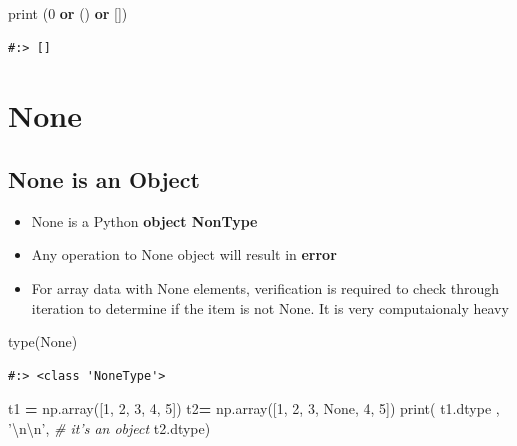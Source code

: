 \documentclass[
]{book}
\newenvironment{Shaded}{\begin{snugshade}}{\end{snugshade}}
\newcommand{\BuiltInTok}[1]{#1}
\newcommand{\CharTok}[1]{\textcolor[rgb]{0.5,0.5,0.5}{#1}}
\newcommand{\CommentTok}[1]{\textcolor[rgb]{0.37,0.37,0.37}{\textit{#1}}}
\newcommand{\DecValTok}[1]{\textcolor[rgb]{0.06,0.06,0.06}{#1}}
\newcommand{\KeywordTok}[1]{\textcolor[rgb]{0.27,0.27,0.27}{\textbf{#1}}}
\newcommand{\NormalTok}[1]{#1}
\newcommand{\OperatorTok}[1]{\textcolor[rgb]{0.43,0.43,0.43}{\textbf{#1}}}
\newcommand{\StringTok}[1]{\textcolor[rgb]{0.5,0.5,0.5}{#1}}
\newcommand{\VariableTok}[1]{\textcolor[rgb]{0,0,0}{#1}}
\providecommand{\tightlist}{%
  \setlength{\itemsep}{0pt}\setlength{\parskip}{0pt}}
\begin{document}
\begin{Shaded}
\begin{Highlighting}[]
\BuiltInTok{print}\NormalTok{ (}\DecValTok{0} \KeywordTok{or}\NormalTok{ () }\KeywordTok{or}\NormalTok{ [])}
\end{Highlighting}
\end{Shaded}

\begin{verbatim}
#:> []
\end{verbatim}

\hypertarget{none}{%
\section{None}\label{none}}

\hypertarget{none-is-an-object}{%
\subsection{None is an Object}\label{none-is-an-object}}

\begin{itemize}
\tightlist
\item
  None is a Python \textbf{object NonType}\\
\item
  Any operation to None object will result in \textbf{error}\\
\item
  For array data with None elements, verification is required to check through iteration to determine if the item is not None. It is very computaionaly heavy
\end{itemize}

\begin{Shaded}
\begin{Highlighting}[]
\BuiltInTok{type}\NormalTok{(}\VariableTok{None}\NormalTok{)}
\end{Highlighting}
\end{Shaded}

\begin{verbatim}
#:> <class 'NoneType'>
\end{verbatim}

\begin{Shaded}
\begin{Highlighting}[]
\NormalTok{t1 }\OperatorTok{=}\NormalTok{ np.array([}\DecValTok{1}\NormalTok{, }\DecValTok{2}\NormalTok{, }\DecValTok{3}\NormalTok{, }\DecValTok{4}\NormalTok{, }\DecValTok{5}\NormalTok{])}
\NormalTok{t2}\OperatorTok{=}\NormalTok{ np.array([}\DecValTok{1}\NormalTok{, }\DecValTok{2}\NormalTok{, }\DecValTok{3}\NormalTok{, }\VariableTok{None}\NormalTok{, }\DecValTok{4}\NormalTok{, }\DecValTok{5}\NormalTok{])}
\BuiltInTok{print}\NormalTok{( t1.dtype  , }\StringTok{'}\CharTok{\textbackslash{}n\textbackslash{}n}\StringTok{'}\NormalTok{,    }\CommentTok{# it's an object}
\NormalTok{       t2.dtype)}
\end{Highlighting}
\end{Shaded}
\end{document}
